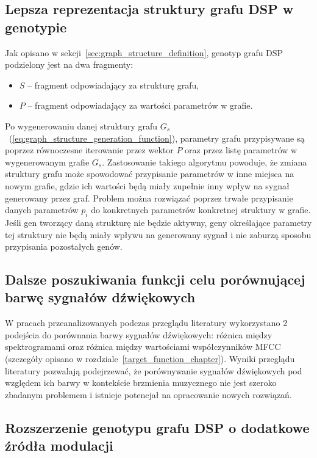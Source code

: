 \subsection{Lepsza reprezentacja struktury grafu DSP w genotypie}

Jak opisano w sekcji~\ref{sec:graph_structure_definition}, genotyp grafu DSP
podzielony jest na dwa fragmenty:

\begin{itemize}
  \item $S$ -- fragment odpowiadający za strukturę grafu,
  \item $P$ -- fragment odpowiadający za wartości parametrów w grafie.
\end{itemize}

Po wygenerowaniu danej struktury grafu $G_s$~(\ref{eq:graph_structure_generation_function}),
parametry grafu przypisywane są poprzez równoczesne iterowanie przez wektor $P$ oraz
przez listę parametrów w wygenerowanym grafie $G_s$. Zastosowanie takiego algorytmu
powoduje, że zmiana struktury grafu może spowodować przypisanie parametrów w inne miejsca
na nowym grafie, gdzie ich wartości będą miały zupełnie inny wpływ na sygnał
generowany przez graf. Problem można rozwiązać poprzez trwałe przypisanie danych
parametrów $p_i$ do konkretnych parametrów konkretnej struktury w grafie. Jeśli gen 
tworzący daną strukturę nie będzie aktywny, geny określające parametry tej struktury nie będą
miały wpływu na generowany sygnał i nie zaburzą sposobu przypisania pozostałych genów.


\subsection{Dalsze poszukiwania funkcji celu porównującej barwę sygnałów dźwiękowych}

W pracach przeanalizowanych podczas przeglądu literatury wykorzystano 2 podejścia
do porównania barwy sygnałów dźwiękowych: różnica między spektrogramami oraz
różnica między wartościami współczynników MFCC
(szczegóły opisano w rozdziale~\ref{target_function_chapter}).
Wyniki przeglądu literatury pozwalają podejrzewać, że porównywanie sygnałów
dźwiękowych pod względem ich barwy w kontekście brzmienia muzycznego
nie jest szeroko zbadanym problemem i istnieje potencjał na opracowanie
nowych rozwiązań.


\subsection{Rozszerzenie genotypu grafu DSP o dodatkowe źródła modulacji}

